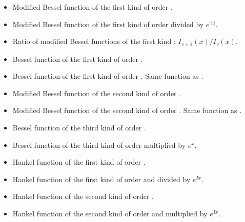 \begin{itemize}
\item {}
  \sshortdescribe   Modified Bessel function of the first
  kind of order .
\item {}
  \sshortdescribe   Modified Bessel function of the first
  kind of order  divided by $e^{|x|}$.
\item {}
  \sshortdescribe Ratio of modified Bessel functions of the first kind : $I_{v+1}(x) /
  I_v (x)$.
\item {}
  \sshortdescribe    Bessel function of the first
  kind of order .
\item {}
  \sshortdescribe    Bessel function of the first
  kind of order . Same function as .
\item {}
  \sshortdescribe   Modified Bessel function of the second
  kind of order .
\item {}
  \sshortdescribe   Modified Bessel function of the second
  kind of order . Same function as .
\item {}
  \sshortdescribe   Bessel function of the third
  kind of order .
\item {}
  \sshortdescribe   Bessel function of the third
  kind of order  multiplied by $e^{x}$.
\item {}
  \sshortdescribe   Hankel function of the first kind of
  order . 
\item {}
  \sshortdescribe  Hankel function of the first kind of order
    and divided by $e^{I x}$.
\item {}
  \sshortdescribe  Hankel function of the second kind of
  order . 
\item {}
  \sshortdescribe  Hankel function of the second kind of
  order   and multiplied by $e^{I x}$.
\end{itemize}

